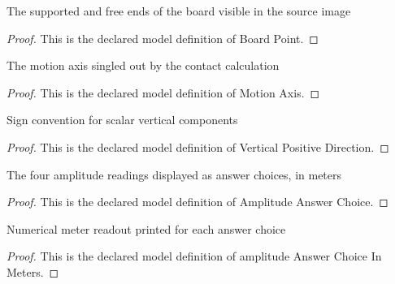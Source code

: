 \begin{definition}
  \label{def:physics:phyx-mini-0205:phyxminiproblems-problemphyxmini0205-boardpoint}
  The supported and free ends of the board visible in the source image
\end{definition}
\begin{proof}
  This is the declared model definition of Board Point.
\end{proof}
\begin{definition}
  \label{def:physics:phyx-mini-0205:phyxminiproblems-problemphyxmini0205-motionaxis}
  The motion axis singled out by the contact calculation
\end{definition}
\begin{proof}
  This is the declared model definition of Motion Axis.
\end{proof}
\begin{definition}
  \label{def:physics:phyx-mini-0205:phyxminiproblems-problemphyxmini0205-verticalpositivedirection}
  Sign convention for scalar vertical components
\end{definition}
\begin{proof}
  This is the declared model definition of Vertical Positive Direction.
\end{proof}
\begin{definition}
  \label{def:physics:phyx-mini-0205:phyxminiproblems-problemphyxmini0205-amplitudeanswerchoice}
  The four amplitude readings displayed as answer choices, in meters
\end{definition}
\begin{proof}
  This is the declared model definition of Amplitude Answer Choice.
\end{proof}
\begin{definition}
  \label{def:physics:phyx-mini-0205:phyxminiproblems-problemphyxmini0205-amplitudeanswerchoiceinmeters}
  Numerical meter readout printed for each answer choice
\end{definition}
\begin{proof}
  This is the declared model definition of amplitude Answer Choice In Meters.
\end{proof}
